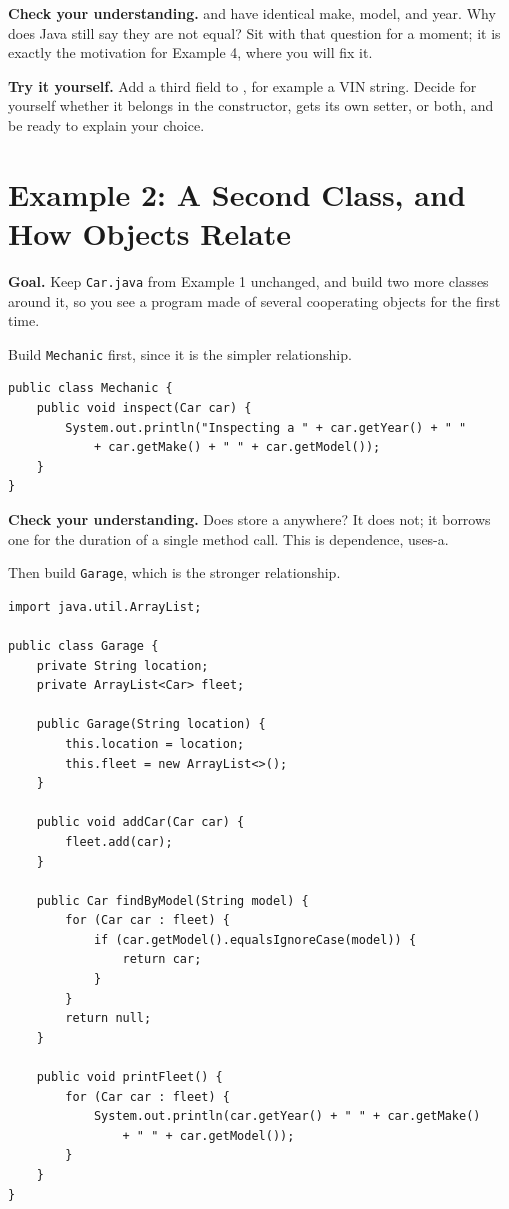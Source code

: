 \documentclass[11pt]{article}
\begin{document}
\textbf{Check your understanding.}  and  have identical
make, model, and year. Why does Java still say they are not equal? Sit with
that question for a moment; it is exactly the motivation for Example 4, where
you will fix it.

\textbf{Try it yourself.} Add a third field to , for example a VIN
string. Decide for yourself whether it belongs in the constructor, gets its own
setter, or both, and be ready to explain your choice.

\section{Example 2: A Second Class, and How Objects Relate}

\textbf{Goal.} Keep \texttt{Car.java} from Example 1 unchanged, and build two
more classes around it, so you see a program made of several cooperating
objects for the first time.

Build \texttt{Mechanic} first, since it is the simpler relationship.

\begin{lstlisting}[style=java]
public class Mechanic {
    public void inspect(Car car) {
        System.out.println("Inspecting a " + car.getYear() + " "
            + car.getMake() + " " + car.getModel());
    }
}
\end{lstlisting}

\textbf{Check your understanding.} Does  store a 
anywhere? It does not; it borrows one for the duration of a single method
call. This is dependence, uses-a.

Then build \texttt{Garage}, which is the stronger relationship.

\begin{lstlisting}[style=java]
import java.util.ArrayList;

public class Garage {
    private String location;
    private ArrayList<Car> fleet;

    public Garage(String location) {
        this.location = location;
        this.fleet = new ArrayList<>();
    }

    public void addCar(Car car) {
        fleet.add(car);
    }

    public Car findByModel(String model) {
        for (Car car : fleet) {
            if (car.getModel().equalsIgnoreCase(model)) {
                return car;
            }
        }
        return null;
    }

    public void printFleet() {
        for (Car car : fleet) {
            System.out.println(car.getYear() + " " + car.getMake()
                + " " + car.getModel());
        }
    }
}
\end{lstlisting}
\end{document}
